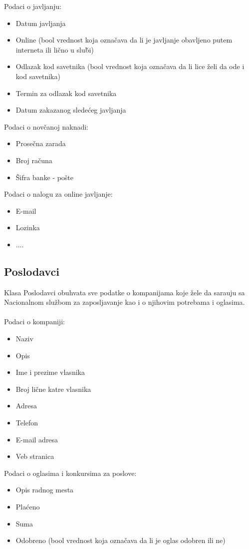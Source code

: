 \noindent Podaci o javljanju:
\begin{itemize}
	\item Datum javljanja
	\item Online (bool vrednost koja ozna\v cava da li je javljanje obavljeno putem interneta ili li\v cno u slu\v bi)
	\item Odlazak kod savetnika (bool vrednost koja ozna\v cava da li lice \v zeli da ode i kod savetnika)
	\item Termin za odlazak kod savetnika
	\item Datum zakazanog slede\' ceg javljanja
\end{itemize}

\noindent Podaci o nov\v canoj naknadi:
\begin{itemize}
	\item Prose\v cna zarada
	\item Broj ra\v cuna
	\item \v Sifra banke - po\v ste
\end{itemize}

\noindent Podaci o nalogu za online javljanje:
\begin{itemize}
	\item E-mail
	\item Lozinka
	\item ....
\end{itemize}

\subsection{Poslodavci}
Klasa Poslodavci obuhvata sve podatke o kompanijama koje \v zele da sara\dj uju sa Nacionalnom slu\v zbom za zaposljavanje kao i o njihovim potrebama i oglasima.
\\
\\ Podaci o kompaniji:
\begin{itemize}
	\item Naziv
	\item Opis
	\item Ime i prezime vlasnika
	\item Broj li\v cne katre vlasnika
	\item Adresa
	\item Telefon
	\item E-mail adresa
	\item Veb stranica
\end{itemize}

\noindent Podaci o oglasima i konkursima za poslove:
\begin{itemize}
	\item Opis radnog mesta
	\item Pla\' ceno
	\item Suma
	\item Odobreno (bool vrednost koja ozna\v cava da li je oglas odobren ili ne)
\end{itemize}

